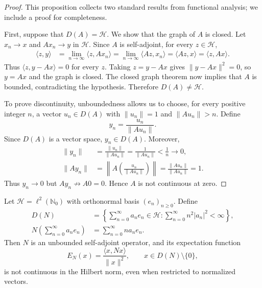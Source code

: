 \documentclass{techbrief}
\begin{document}
\begin{proof}
	This proposition collects two standard results from functional analysis; we include a proof for completeness.
	
	First, suppose that $D(A)=\mathcal{H}$. We show that the graph
	of $A$ is closed. Let $x_n\to x$ and $Ax_n\to y$ in
	$\mathcal{H}$. Since $A$ is self-adjoint, for every
	$z\in\mathcal{H}$,
	\begin{equation*}
		\begin{aligned}
			\langle z,y\rangle
			&=\lim_{n\to\infty}\langle z,Ax_n\rangle =\lim_{n\to\infty}\langle Az,x_n\rangle =\langle Az,x\rangle =\langle z,Ax\rangle.
		\end{aligned}
	\end{equation*}
	Thus $\langle z,y-Ax\rangle=0$ for every $z$. Taking
	$z=y-Ax$ gives $\|y-Ax\|^2=0$, so $y=Ax$ and the graph
	is closed. The closed graph theorem now implies that $A$
	is bounded, contradicting the hypothesis. Therefore
	$D(A)\neq\mathcal{H}$.
	
	To prove discontinuity, unboundedness allows us to choose,
	for every positive integer $n$, a vector $u_n\in D(A)$ with
	$\|u_n\|=1$ and $\|Au_n\|>n$. Define
	\begin{equation*}
		y_n=\frac{u_n}{\|Au_n\|}.
	\end{equation*}
	Since $D(A)$ is a vector space, $y_n\in D(A)$. Moreover,
	\begin{equation*}
		\begin{aligned}
			\|y_n\|
			&=\frac{\|u_n\|}{\|Au_n\|}
			=\frac{1}{\|Au_n\|}
			<\frac{1}{n}\longrightarrow0,\\
			\|Ay_n\|
			&=\left\|A\left(\frac{u_n}{\|Au_n\|}\right)\right\|
			=\frac{\|Au_n\|}{\|Au_n\|}
			=1.
		\end{aligned}
	\end{equation*}
	Thus $y_n\to0$ but $Ay_n\not\to A0=0$. Hence $A$ is
	not continuous at zero.
\end{proof}

\begin{prop}\label{numberOperatorExample}
	Let $\mathcal{H}=\ell^2(\mathbb{N}_0)$ with orthonormal basis
	$(e_n)_{n\geq0}$. Define
	\begin{equation*}
		\begin{aligned}
			D(N)&=\left\{\sum_{n=0}^{\infty}a_ne_n\in\mathcal{H}:
			\sum_{n=0}^{\infty}n^2|a_n|^2<\infty\right\},\\
			N\left(\sum_{n=0}^{\infty}a_ne_n\right)
			&=\sum_{n=0}^{\infty}na_ne_n.
		\end{aligned}
	\end{equation*}
	Then $N$ is an unbounded self-adjoint operator, and its
	expectation function
	\begin{equation*}
		E_N(x)=\frac{\langle x,Nx\rangle}{\|x\|^2},
		\qquad x\in D(N)\setminus\{0\},
	\end{equation*}
	is not continuous in the Hilbert norm, even when restricted
	to normalized vectors.
\end{prop}
\end{document}
